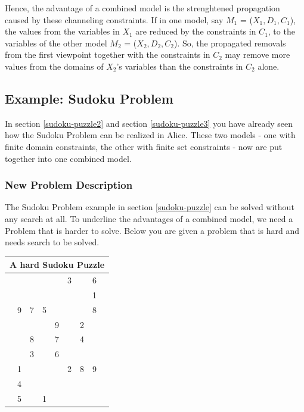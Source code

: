 \documentclass[a4paper]{scrartcl}
\begin{document}
Hence, the advantage of a combined model is the strenghtened
propagation caused by these channeling constraints. If in one
model, say $M_1$ = ($X_1, D_1, C_1$), the values from the variables
in $X_1$ are reduced by the constraints in $C_1$,  to the variables of the
other model $M_2$ = ($X_2, D_2, C_2$). So, the propagated removals
from the first viewpoint together with the constraints in $C_2$ may
remove more values from the domains of $X_2$'s variables than the
constraints in $C_2$ alone.\\


\newpage
\subsection{Example: Sudoku Problem}
In section \ref{sudoku-puzzle2} and section \ref{sudoku-puzzle3}
you have already seen how the Sudoku Problem can be realized
in Alice. These two models - one with finite domain constraints,
the other with finite set constraints - now are put together
into one combined model.

\subsubsection{New Problem Description}
The Sudoku Problem example in section \ref{sudoku-puzzle} can
be solved without any search at all. To underline the advantages
of a combined model, we need a Problem that is harder to solve.
Below you are given a problem that is hard  and needs search to be 
solved.\\[1.0cm]


\begin{tabular}{||c|c|c||c|c|c||c|c|c||}
\hline
\multicolumn{9}{||c||}{A hard Sudoku Puzzle \label{hard-sudoku-problem}}\\
\hline
\hline
 &  &  &  &  & 3  &  & 6 & \\
\hline
 &  &  &  &  &  &  & 1  & \\
\hline
 & 9 & 7 & 5 &  &  &  & 8 & \\
\hline
\hline
 &  &  &  & 9 &  & 2 &  & \\
\hline
 &  & 8 &  & 7 &  & 4 &  & \\
\hline
 &  & 3 &  & 6 &  &  &  & \\
\hline
\hline
 & 1 &  &  &  & 2 & 8 & 9 & \\
\hline
 & 4 &  &  &  &  &  &  & \\
\hline
 & 5 &  & 1 &  &  &  &  & \\
\hline   
\end{tabular}\\[1.0cm]
\end{document}
